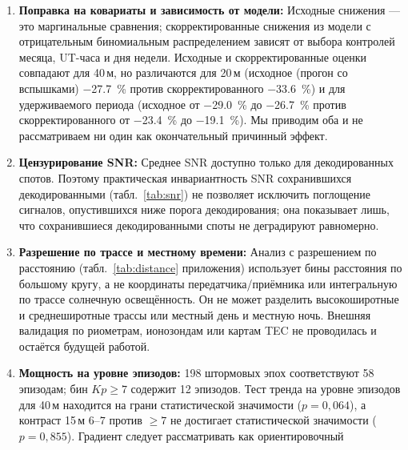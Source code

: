 \documentclass{agujournal2019}
\begin{document}
\begin{enumerate}
	      окончательно: наблюдаемое отношение 1,44 близко к ожидаемому
	      $\approx$1,35 из роста спокойного базового уровня на
	      $\SI{+35}{\percent}$, но широкий ДИ совместим как с
	      пропорциональным ростом, так и с инвариантностью. Процентные снижения остаются более стабильной метрикой. Архивное воспроизведение исходных чисел
	      на основе снимка доступно в теге выпуска v1.1.0; в этой рукописи
	      используется живая повторная выгрузка (тег v1.5.0).
	\item \textbf{Поправка на ковариаты и зависимость от модели:} Исходные
	      снижения — это маргинальные сравнения; скорректированные снижения
	      из модели с отрицательным биномиальным распределением зависят от
	      выбора контролей месяца, UT-часа и дня недели. Исходные
	      и скорректированные оценки совпадают для 40\,м, но различаются
	      для 20\,м (исходное (прогон со вспышками) \SI{-27.7}{\percent} против скорректированного
	      \SI{-33.6}{\percent}) и для удерживаемого периода (исходное
	      от \SI{-29.0}{\percent} до \SI{-26.7}{\percent} против скорректированного
	      от \SI{-23.4}{\percent} до \SI{-19.1}{\percent}). Мы приводим оба и не
	      рассматриваем ни один как окончательный причинный эффект.
	\item \textbf{Цензурирование SNR:} Среднее SNR доступно только для
	      декодированных спотов. Поэтому практическая инвариантность SNR сохранившихся декодированными
	      (табл.~\ref{tab:snr}) не позволяет исключить поглощение
	      сигналов, опустившихся ниже порога декодирования; она показывает лишь,
	      что сохранившиеся декодированными споты не деградируют равномерно.
	\item \textbf{Разрешение по трассе и местному времени:} Анализ
	      с разрешением по расстоянию (табл.~\ref{tab:distance} приложения)
	      использует бины расстояния по большому кругу, а не координаты
	      передатчика/приёмника или интегральную по трассе солнечную
	      освещённость. Он не может разделить высокоширотные
	      и среднеширотные трассы или местный день и местную ночь. Внешняя
	      валидация по риометрам, ионозондам или картам TEC не проводилась
	      и остаётся будущей работой.
	\item \textbf{Мощность на уровне эпизодов:} 198 штормовых эпох
	      соответствуют 58 эпизодам; бин $Kp \ge 7$ содержит 12 эпизодов.
	      Тест тренда на уровне эпизодов для 40\,м находится на грани статистической значимости ($p = 0{,}064$),
	      а контраст 15\,м $6\text{--}7$ против $\ge 7$ не достигает статистической значимости
	      ($p = 0{,}855$). Градиент следует рассматривать как ориентировочный

\end{enumerate}
\end{document}
